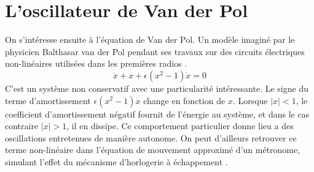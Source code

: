 \chapter{L'oscillateur de Van der Pol}
%
On s'intéresse ensuite à l'équation de Van der Pol. Un modèle imaginé par le physicien Balthasar van der Pol
pendant ses travaux sur des circuits électriques non-linéaires utilisées dans les premières radios \cite{strogatz_nonlinear_2015}.
%
\begin{equation}
    \ddot{x} + x + \epsilon(x^2 - 1)\dot{x} = 0
    \label{eq:vdp}
\end{equation}
%
C'est un système non conservatif avec une particularité intéressante. 
Le signe du terme d'amortissement $\epsilon(x^2 - 1)\dot{x}$ change en fonction de $x$. 
Lorsque $|x|<1$, le coefficient d'amortissement négatif fournit de l'énergie au système, et dans le cas contraire $|x|>1$, il en dissipe. 
Ce comportement particulier donne lieu a des oscillations entretenues de manière autonome.
On peut d'ailleurs retrouver ce terme non-linéaire dans l'équation de mouvement approximé d'un métronome, 
simulant l'effet du mécanisme d'horlogerie à échappement \cite{wang_-phase_2018}.

